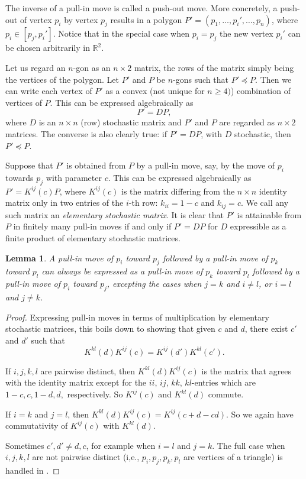 \documentclass[11pt]{amsart}
\newtheorem{lemma}[theorem]{Lemma}
\theoremstyle{remark}
\numberwithin{equation}{section}
\newcommand{\R}{\mathbb{R}}
\renewcommand{\precsim}{\preccurlyeq}
\renewcommand{\geq}{\geqslant}
\begin{document}
The inverse of a pull-in move is called a push-out move. More concretely, a push-out of vertex $p_i$ by vertex $p_j$ 
results in a polygon $P'=(p_1,\ldots,p_i',\ldots,p_n)$, where $p_i\in [p_j,p_i']$. Notice that in the special case when $p_i=p_j$ the new vertex
$p_i'$ can be chosen arbitrarily in $\R^2$. 


Let us regard an $n$-gon as an $n\times 2$ matrix, the rows of the matrix simply being the vertices of the polygon. 
Let $P'$ and $P$ be $n$-gons such that $P'\precsim P$. Then we can write each vertex of $P'$ as a convex (not unique for $n\geq 4)$) combination of vertices of $P$. This can be expressed algebraically as
\[
P'=DP,
\]
where $D$ is an $n\times n$ (row) stochastic matrix and $P'$ and $P$ are regarded as $n\times 2$ matrices. The converse is also clearly true: if $P'=DP$, with $D$ stochastic, then $P'\precsim P$. 

Suppose that $P'$ is obtained from $P$ by a pull-in move, say, by the move of $p_i$ towards $p_j$ with parameter $c$. This can be expressed algebraically  as $P'=K^{ij}(c)P$, where $K^{ij}(c)$ is the matrix differing from the $n\times n$ identity matrix only in two entries of the $i$-th row: $k_{ii}=1-c$ and $k_{ij}=c$. We call any such  matrix an \emph{elementary stochastic matrix}. 
It is clear that $P'$ is attainable from $P$ in finitely many pull-in moves if and only if $P'=DP$ for $D$ expressible as a finite product of elementary stochastic matrices. 
 

\begin{lemma}\label{commutingmoves}
A pull-in move of $p_i$ toward $p_j$ followed by a pull-in move of $p_k$ toward $p_l$ can always be expressed as 
a pull-in move of $p_k$ toward $p_l$ followed by a pull-in move of $p_i$ toward $p_j$, excepting the cases when
 $j=k$ and $i\neq l$, or  $i=l$ and  $j\neq k$. 
\end{lemma} 
\begin{proof}
Expressing pull-in moves in terms of multiplication by elementary stochastic matrices, this boils down to showing that given $c$ and $d$, there exist $c'$ and $d'$ such that
\[
K^{kl}(d)K^{ij}(c)=K^{ij}(d')K^{kl}(c').
\]


 If $i,j,k,l$ are pairwise distinct, then $K^{kl}(d)K^{ij}(c)$ is the matrix that agrees with the identity matrix except for the $ii$, $ij$, $kk$, $kl$-entries which are  $1-c,c,1-d, d,$ respectively. So $K^{ij}(c)$ and $K^{kl}(d)$ commute.
 
 
 If $i=k$ and $j=l$, then $K^{kl}(d)K^{ij}(c)=K^{ij}(c+d-cd).$ So we again have commutativity of $K^{ij}(c)$ with $K^{kl}(d)$.

  Sometimes $c',d'\neq d,c$, for example when $i=l$ and $j=k$. The full case when $i,j,k,l$ are not pairwise distinct (i,e., 
$p_i,p_j,p_k,p_l$ are vertices of a triangle) is handled in \cite[Lemma 3.2]{frydman2}. 
\end{proof}
\end{document}
